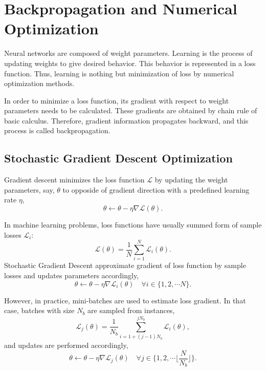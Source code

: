 \section{Backpropagation and Numerical Optimization}
\label{sec:backprop}

Neural networks are composed of weight parameters. 
Learning is the process of updating weights to give desired behavior. 
This behavior is represented in a loss function. Thus, learning is nothing but minimization of loss by numerical optimization methods. 

In order to minimize a loss function, its gradient with respect to weight parameters needs to be calculated. 
These gradients are obtained by chain rule of basic calculus. 
Therefore, gradient information propagates backward, and this process is called backpropagation. 

\subsection{Stochastic Gradient Descent Optimization}

Gradient descent minimizes the loss function $\mathcal{L}$ by updating the weight parameters, say, $\theta$ to opposide of gradient direction with a predefined learning rate $\eta$, 
\begin{equation}
\label{eq: grad_desc}
\theta \leftarrow \theta - \eta \nabla \mathcal{L}(\theta).
\end{equation}

In machine learning problems, loss functions have usually summed form of sample losses $\mathcal{L}_i$: 
\begin{equation}
\label{eqn:summed_loss}
\mathcal{L}(\theta) = \frac{1}{N} \sum_{i=1}^{N} \mathcal{L}_i(\theta).
\end{equation}
Stochastic Gradient Descent approximate gradient of loss function by sample losses and updates parameters accordingly,
\begin{equation}
\label{eqn:stch_grad_desc}
\theta \leftarrow \theta - \eta \nabla \mathcal{L}_i(\theta) \quad \forall i \in \{1,2, \cdots N\}.
\end{equation}

However, in practice, mini-batches are used to estimate loss gradient. 
In that case, batches with size $N_b$ are sampled from instances, \begin{equation}
\label{eqn:mb_summed_loss}
\mathcal{L}_j(\theta) = \frac{1}{N_b} \sum_{i=1 + (j-1) N_b}^{j N_b} \mathcal{L}_i(\theta),
\end{equation}
and updates are performed accordingly,
\begin{equation}
\label{eqn:mb_grad_desc}
\theta \leftarrow \theta - \eta  \nabla \mathcal{L}_j(\theta) \quad \forall j \in \{1,2, \cdots \Big\lfloor\frac{N}{N_b}\Big\rfloor\}.
\end{equation}

